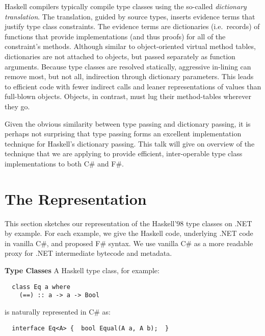 \documentclass[9pt]{sig-alternate-05-2015}
\begin{document}
Haskell compilers typically compile type classes using the so-called
\emph{dictionary translation}.  The translation, guided by source
types, inserts evidence terms that justify type class constraints. The evidence terms are dictionaries (i.e.\ records) of functions that provide implementations (and thus proofs) for all of the constraint's methods. Although similar to
object-oriented virtual method tables, dictionaries are not attached to
objects, but passed separately as function arguments.  Because type
classes are resolved statically, aggressive in-lining can remove most,
but not all, indirection through dictionary parameters. This leads to
efficient code with fewer indirect calls and leaner representations of values than full-blown objects. Objects, in contrast, must lug their method-tables wherever they go.

Given the obvious similarity between type passing and dictionary
passing, it is perhaps not surprising that type passing forms an
excellent implementation technique for Haskell's dictionary passing. 
This talk will give on overview of the technique that we are applying to provide
efficient, inter-operable type class implementations to both C\# and F\#.


\section{The Representation}

This section sketches our representation of the Haskell'98 type classes on .NET by example.
For each example, we give the Haskell code, underlying .NET code in vanilla C\#, and proposed F\# syntax.
We use vanilla C\# as a more readable proxy for .NET intermediate bytecode and metadata.


{\bf Type Classes} A Haskell type class, for example:

{
\small
{}
\begin{lstlisting}
  class Eq a where 
    (==) :: a -> a -> Bool
\end{lstlisting}}
\noindent is naturally represented in C\# as:
\begin{lstlisting}
  interface Eq<A> {  bool Equal(A a, A b);  }
\end{lstlisting}
\end{document}
